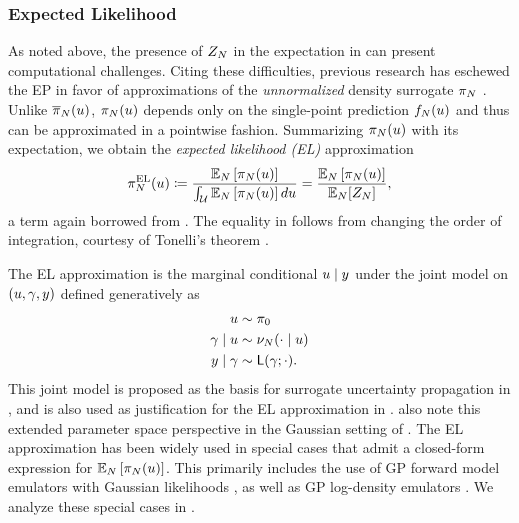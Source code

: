 \documentclass[12pt]{article}
\begin{document}
\subsubsection{Expected Likelihood}
As noted above, the presence of $Z_{N}$ in the expectation in 
can present computational challenges. Citing these difficulties, previous research has 
eschewed the EP in favor of approximations of the \textit{unnormalized}
density surrogate $\pi_{N}$ \citep{StuartTeck1,StuartTeck2,VehtariParallelGP}. Unlike 
$\overline{\pi}_{N}(u)$, $\pi_{N}(u)$ depends only on the single-point prediction 
$f_{N}(u)$ and thus can be approximated in a pointwise fashion. 
Summarizing $\pi_{N}(u)$ with its expectation, we obtain the \textit{expected likelihood (EL)} approximation
\begin{equation}
\pi_{N}^{\mathrm{EL}}(u) \coloneqq 
\frac{\mathbb{E}_{N}\left[\pi_{N}(u) \right]}{\int_{\mathcal{U}} \mathbb{E}_{N}\left[\pi_{N}(u) \right] du}
= \frac{\mathbb{E}_{N}\left[\pi_{N}(u) \right]}{\mathbb{E}_{N}[Z_{N}]}, \label{eq:post-approx-EL} 
\end{equation}
a term again borrowed from \cite{BurknerSurrogate}. The equality in  follows from
changing the order of integration, courtesy of Tonelli's theorem \citep{StuartTeck1}. 

The EL approximation is the marginal conditional $u \mid y$ under the joint model on 
$(u, \gamma, y)$ defined generatively as
\begin{align}
u &\sim \pi_0 \label{eq:el-prob-model} \\
\gamma \mid u &\sim \nu_{N}(\cdot \mid u) \nonumber \\
y \mid \gamma &\sim \mathsf{L}(\gamma; \cdot). \nonumber
\end{align}
This joint model is proposed as the basis for surrogate uncertainty propagation in 
\citet{BilionisBayesSurrogates}, and is also used as justification for the EL approximation
in \citet{SinsbeckNowak}. \citet{StuartTeck2,CES} also note this extended parameter space 
perspective in the Gaussian setting of . The EL approximation
has been widely used in special cases that admit a closed-form expression for 
$\mathbb{E}_{N}\left[\pi_{N}(u) \right]$. This primarily includes the use of GP forward
model emulators with Gaussian likelihoods 
\citep{weightedIVAR,StuartTeck2,GP_PDE_priors,CES,idealizedGCM,
villani2024posteriorsamplingadaptivegaussian,hydrologicalModel,hydrologicalModel2},
as well as GP log-density emulators 
\citep{VehtariParallelGP,StuartTeck1,StuartTeck2,GP_PDE_priors, random_fwd_models,TeckHyperpar}. 
We analyze these special cases in .
\end{document}
